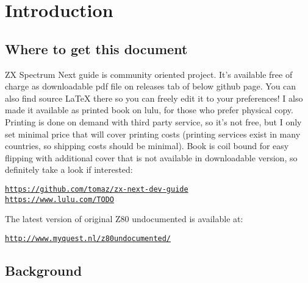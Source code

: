 \documentclass[twoside,openright,a4paper]{book}
\begin{document}
\chapter{Introduction}

\minitoc


\section{Where to get this document}

ZX Spectrum Next guide is community oriented project. It's available free of charge as downloadable pdf file on releases tab of below github page. You can also find source {\LaTeX} there so you can freely edit it to your preferences! I also made it available as printed book on lulu, for those who prefer physical copy. Printing is done on demand with third party service, so it's not free, but I only set minimal price that will cover printing costs (printing services exist in many countries, so shipping costs should be minimal). Book is coil bound for easy flipping with additional cover that is not available in downloadable version, so definitely take a look if interested:

{\tt \url{https://github.com/tomaz/zx-next-dev-guide}}\\
{\tt \url{https://www.lulu.com/TODO}}

The latest version of original Z80 undocumented is available at:

{\tt \url{http://www.myquest.nl/z80undocumented/}}


\pagebreak
\section{Background}
\end{document}
